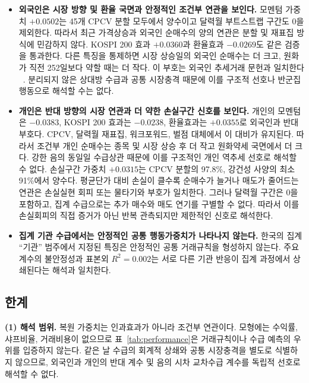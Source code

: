 \begin{itemize}
\item \textbf{외국인은 시장 방향 및 환율 국면과 안정적인 조건부 연관을 보인다.}
모멘텀 가중치 $+0.0502$는 45개 CPCV 분할 모두에서 양수이고 달력월 부트스트랩
구간도 0을 제외한다. 따라서 최근 가격상승과 외국인 순매수의 양의 연관은 분할 및
재표집 방식에 민감하지 않다. KOSPI 200 효과 $+0.0360$과 환율효과 $-0.0269$도 같은
검증을 통과한다. 다른 특징을 통제하면 시장 상승일의 외국인 순매수는 더 크고, 원화가
직전 252일보다 약할 때는 더 작다. 이 부호는 외국인 추세거래 문헌과 일치한다
~\cite{grinblatt2000investment,choe1999foreign}. 분리되지 않은 상대방 수급과 공통
시장충격 때문에 이를 구조적 선호나 반군집행동으로 해석할 수는 없다.

\item \textbf{개인은 반대 방향의 시장 연관과 더 약한 손실구간 신호를 보인다.}
개인의 모멘텀은 $-0.0383$, KOSPI 200 효과는 $-0.0238$, 환율효과는 $+0.0355$로
외국인과
반대 부호다. CPCV, 달력월 재표집, 워크포워드, 벌점 대체에서 이 대비가 유지된다.
따라서 조건부 개인 순매수는 종목 및 시장 상승 후 더 작고 원화약세 국면에서 더 크다.
강한 음의 동일일 수급상관 때문에 이를 구조적인 개인 역추세 선호로 해석할 수 없다.
손실구간 가중치 $+0.0315$는 CPCV 분할의 97.8\%, 강건성 사양의 최소 91\%에서 양수다.
평균단가 대비 손실이 클수록 순매수가 늘거나 매도가 줄어드는 연관은 손실실현 회피 또는
물타기와 부호가 일치한다. 그러나 달력월 구간은 0을 포함하고, 집계 수급으로는 추가
매수와 매도 연기를 구별할 수 없다. 따라서 이를 손실회피의 직접 증거가 아닌 반복
관측되지만 제한적인 신호로 해석한다.

\item \textbf{집계 기관 수급에서는 안정적인 공통 행동가중치가 나타나지 않는다.}
한국의 집계 ``기관'' 범주에서 지정된 특징은 안정적인 공통 거래규칙을 형성하지 않는다.
주요 계수의 불안정성과 표본외 $R^2=0.002$는 서로 다른 기관 반응이 집계 과정에서
상쇄된다는 해석과 일치한다.
\end{itemize}

\subsection{한계}
\label{sec:limitations}

\textbf{(1) 해석 범위.} 복원 가중치는 인과효과가 아니라 조건부 연관이다. 모형에는
수익률, 샤프비율, 거래비용이 없으므로 표~\ref{tab:performance}은 거래규칙이나 수급
예측의 우위를 입증하지 않는다. 같은 날 수급의 회계적 상쇄와 공통 시장충격을 별도로
식별하지 않으므로, 외국인과 개인의 반대 계수 및 음의 시차 교차수급 계수를 독립적
선호로 해석할 수 없다.

